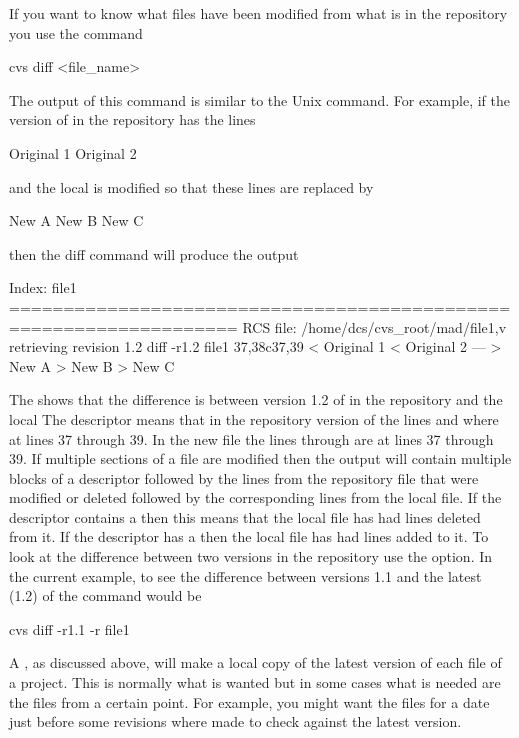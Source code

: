 If you want to know what files have been modified from what is in the
repository you use the command
\begin{example}
  cvs diff <file_name>
\end{example}
The output of this command is similar to the Unix  command.
For example, if the version of  in the repository has the lines
\begin{example}
  Original 1
  Original 2
\end{example}
and the local  is modified so that these lines are replaced by
\begin{example}
  New A
  New B
  New C
\end{example}
then the diff command will produce the output
\begin{example}
  Index: file1
  ===================================================================
  RCS file: /home/dcs/cvs_root/mad/file1,v
  retrieving revision 1.2
  diff -r1.2 file1
  37,38c37,39
  < Original 1
  < Original 2
  ---
  > New A
  > New B
  > New C
\end{example}
The  shows that the difference is between version
1.2 of  in the repository and the local  The
 descriptor means that in the repository version of
 the lines  and  where at
lines 37 through 39. In the new file the lines  through
 are at lines 37 through 39. If multiple sections of a file
are modified then the  output will contain multiple blocks of
a descriptor followed by the lines from the repository file that were
modified or deleted followed by the corresponding lines from the local
file.  If the descriptor contains a  then this means that the
local file has had lines deleted from it. If the descriptor has a
 then the local file has had lines added to it. To look at the
difference between two versions in the repository use the  option. In the current example, to see the difference
between versions 1.1 and the latest (1.2) of  the command
would be
\begin{example}
  cvs diff -r1.1 -r file1
\end{example}

A , as discussed above, will make a local copy of the latest
version of each file of a project. This is normally what is wanted but
in some cases what is needed are the files from a certain point. For
example, you might want the files for a date just before some
revisions where made to check against the latest version. 

